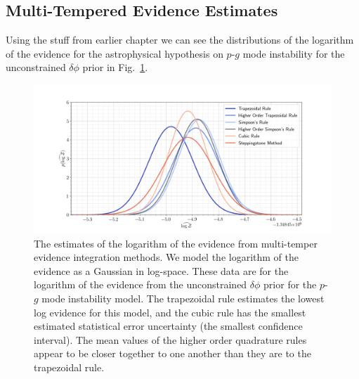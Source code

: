 \subsection{Multi-Tempered Evidence Estimates}\label{sec:ti_ssa_performance}
Using the stuff from earlier chapter we can see the distributions of the logarithm of the evidence for the astrophysical hypothesis on $p$-$g$ mode instability for the unconstrained $\delta \phi$ prior in Fig.~\ref{fig:lvc_sim_log_evidence_distr}.

\begin{figure}[th]
\centering
\includegraphics[width=1.0\textwidth]{figs/chapter6/multi_temper_log_z_lsc_sim.png}
\caption{The estimates of the logarithm of the evidence from multi-temper evidence integration methods. We model the logarithm of the evidence as a Gaussian in log-space. These data are for the logarithm of the evidence from the unconstrained $\delta \phi$ prior for the $p$-$g$ mode instability model. The trapezoidal rule estimates the lowest log evidence for this model, and the cubic rule has the smallest estimated statistical error uncertainty (the smallest confidence interval). The mean values of the higher order quadrature rules appear to be closer together to one another than they are to the trapezoidal rule.}
\label{fig:lvc_sim_log_evidence_distr}
\end{figure}

